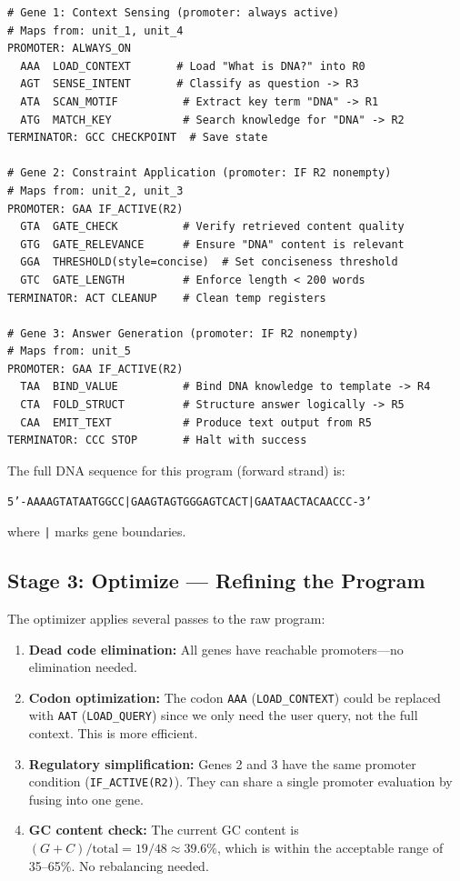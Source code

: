 \begin{lstlisting}[style=dogmapython, caption={Codon program for ``What is DNA?'' (pseudocode).}]
# Gene 1: Context Sensing (promoter: always active)
# Maps from: unit_1, unit_4
PROMOTER: ALWAYS_ON
  AAA  LOAD_CONTEXT       # Load "What is DNA?" into R0
  AGT  SENSE_INTENT       # Classify as question -> R3
  ATA  SCAN_MOTIF          # Extract key term "DNA" -> R1
  ATG  MATCH_KEY           # Search knowledge for "DNA" -> R2
TERMINATOR: GCC CHECKPOINT  # Save state

# Gene 2: Constraint Application (promoter: IF R2 nonempty)
# Maps from: unit_2, unit_3
PROMOTER: GAA IF_ACTIVE(R2)
  GTA  GATE_CHECK          # Verify retrieved content quality
  GTG  GATE_RELEVANCE      # Ensure "DNA" content is relevant
  GGA  THRESHOLD(style=concise)  # Set conciseness threshold
  GTC  GATE_LENGTH         # Enforce length < 200 words
TERMINATOR: ACT CLEANUP    # Clean temp registers

# Gene 3: Answer Generation (promoter: IF R2 nonempty)
# Maps from: unit_5
PROMOTER: GAA IF_ACTIVE(R2)
  TAA  BIND_VALUE          # Bind DNA knowledge to template -> R4
  CTA  FOLD_STRUCT         # Structure answer logically -> R5
  CAA  EMIT_TEXT           # Produce text output from R5
TERMINATOR: CCC STOP       # Halt with success
\end{lstlisting}

\noindent The full DNA sequence for this program (forward strand) is:
\begin{center}
\small\texttt{5'-AAA\;AGT\;ATA\;ATG\;GCC\;|\;GAA\;GTA\;GTG\;GGA\;GTC\;ACT\;|\;GAA\;TAA\;CTA\;CAA\;CCC-3'}
\end{center}
where \texttt{|} marks gene boundaries.

\subsection{Stage 3: Optimize --- Refining the Program}

The optimizer applies several passes to the raw program:

\begin{enumerate}[leftmargin=1.8em]
  \item \textbf{Dead code elimination:} All genes have reachable promoters---no elimination needed.
  \item \textbf{Codon optimization:} The codon \texttt{AAA} (\texttt{LOAD\_CONTEXT}) could be replaced with \texttt{AAT} (\texttt{LOAD\_QUERY}) since we only need the user query, not the full context. This is more efficient.
  \item \textbf{Regulatory simplification:} Genes 2 and 3 have the same promoter condition (\texttt{IF\_ACTIVE(R2)}). They can share a single promoter evaluation by fusing into one gene.
  \item \textbf{GC content check:} The current GC content is $(G + C) / \text{total} = 19/48 \approx 39.6\%$, which is within the acceptable range of 35--65\%. No rebalancing needed.
\end{enumerate}

